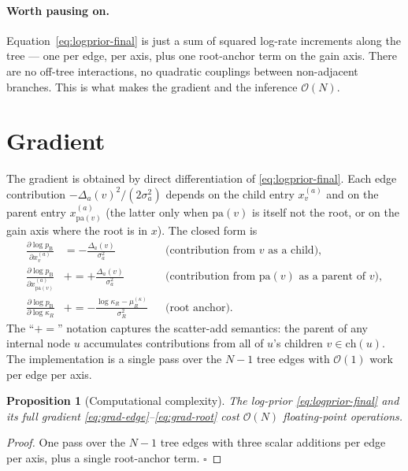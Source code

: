 \documentclass[11pt]{article}
\newcommand{\pa}{\mathrm{pa}}
\newcommand{\ch}{\mathrm{ch}}
\newcommand{\troot}{R}
\newcommand{\rate}{\kappa}             %
\newcommand{\loss}{\mu}                %
\newtheorem{proposition}[theorem]{Proposition}
\theoremstyle{definition}
\begin{document}
\paragraph{Worth pausing on.}
Equation~\eqref{eq:logprior-final} is just a sum of squared
log-rate increments along the tree --- one per edge, per axis, plus
one root-anchor term on the gain axis. There are no off-tree
interactions, no quadratic couplings between non-adjacent branches.
This is what makes the gradient and the inference $\mathcal{O}(N)$.

\section{Gradient}
\label{sec:gradient}

The gradient is obtained by direct differentiation of
\eqref{eq:logprior-final}. Each edge contribution
$-\Delta_a(v)^2/(2\sigma_a^2)$ depends on the child entry $x^{(a)}_v$
and on the parent entry $x^{(a)}_{\pa(v)}$ (the latter only when
$\pa(v)$ is itself not the root, or on the gain axis where the root
is in $x$). The closed form is
\begin{align}
\frac{\partial \log p_{\mathrm{B}}}{\partial x^{(a)}_v}
&= -\frac{\Delta_a(v)}{\sigma_a^2}
&&\text{(contribution from } v \text{ as a child)},
\label{eq:grad-edge}\\
\frac{\partial \log p_{\mathrm{B}}}{\partial x^{(a)}_{\pa(v)}}
&\mathrel{+}= +\frac{\Delta_a(v)}{\sigma_a^2}
&&\text{(contribution from } \pa(v) \text{ as a parent of } v\text{)},
\label{eq:grad-parent}\\
\frac{\partial \log p_{\mathrm{B}}}{\partial \log\rate_\troot}
&\mathrel{+}= -\frac{\log\rate_\troot - \loss^{(\rate)}_\troot}{\sigma_\troot^2}
&&\text{(root anchor)}.
\label{eq:grad-root}
\end{align}
The ``$\mathrel{+}=$'' notation captures the scatter-add semantics:
the parent of any internal node $u$ accumulates contributions from
all of $u$'s children $v\in\ch(u)$. The implementation is a single
pass over the $N-1$ tree edges with $\mathcal{O}(1)$ work per edge
per axis.

\begin{proposition}[Computational complexity]\label{prop:complexity}
The log-prior \eqref{eq:logprior-final} and its full gradient
\eqref{eq:grad-edge}--\eqref{eq:grad-root} cost
$\mathcal{O}(N)$ floating-point operations.
\end{proposition}
\begin{proof}
One pass over the $N-1$ tree edges with three scalar additions per
edge per axis, plus a single root-anchor term. $\square$
\end{proof}
\end{document}
